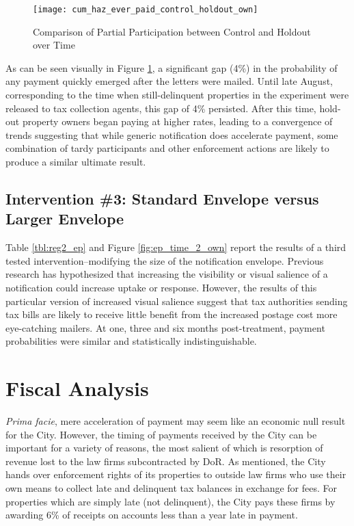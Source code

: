 \documentclass[12pt,titlepage]{article}
\begin{document}
\begin{figure}[htpb]
\begin{center}
\caption{Comparison of Partial Participation between Control and Holdout over Time}
\label{fig:ep_time_ch_own}
\bigskip
\texttt{[image: cum\_haz\_ever\_paid\_control\_holdout\_own]}
\end{center}
\end{figure}


As can be seen visually in Figure \ref{fig:ep_time_ch_own}, 
a significant gap (4\%) in the probability 
of any payment quickly emerged after the letters were mailed. Until 
late August, corresponding to the time when still-delinquent properties 
in the experiment were released to tax collection agents, this gap of 
4\% persisted. After this time, hold-out property owners began paying 
at higher rates, leading to a convergence of trends suggesting that 
while generic notification does accelerate payment, some
combination of tardy participants and other enforcement actions are 
likely to produce a similar ultimate result. 

\subsection{Intervention \#3: Standard Envelope versus Larger Envelope}

Table \ref{tbl:reg2_ep} and Figure \ref{fig:ep_time_2_own} 
report the results of a third tested
intervention--modifying the size of the notification envelope.
Previous research has hypothesized that increasing the visibility or visual 
salience of a notification could increase uptake or response.
However, the results of this particular version of increased visual salience 
suggest that tax authorities sending tax bills are likely to receive little 
benefit from the increased postage cost more eye-catching mailers. 
At one, three and six months post-treatment, payment probabilities 
were similar and statistically indistinguishable. 

\section{Fiscal Analysis}

\textit{Prima facie}, mere acceleration of payment may seem like an
economic null result for the City. However, the timing of payments received
by the City can be important for a variety of reasons, the most salient of
which is resorption of revenue lost to the law firms subcontracted by DoR.
As mentioned, the City hands over enforcement rights of its properties to
outside law firms who use their own means to collect late and delinquent
tax balances in exchange for fees. For properties which are simply late
(not delinquent), the City pays these firms by awarding 6\% of receipts on
accounts less than a year late in payment.
\end{document}
